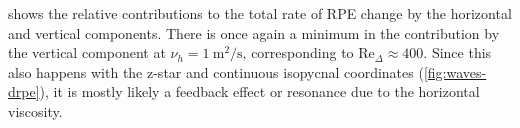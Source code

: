 
 shows the relative contributions to the total rate of RPE change by the horizontal and vertical components. There is once again a minimum in the contribution by the vertical component at $\nu_h = \SI{1}{\square\metre\per\second}$, corresponding to $\mathrm{Re}_\Delta \approx 400$. Since this also happens with the z-star and continuous isopycnal coordinates (\cref{fig:waves-drpe}), it is mostly likely a feedback effect or resonance due to the horizontal viscosity.
